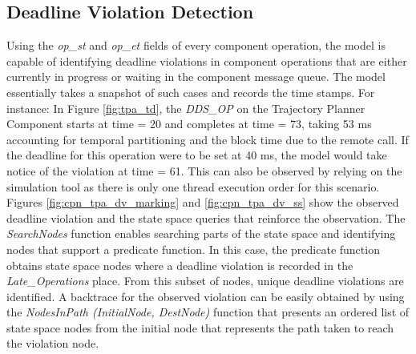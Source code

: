 
\subsection{Deadline Violation Detection}

Using the \emph{op\_st} and \emph{op\_et} fields of every component operation, the model is capable of identifying deadline violations in component operations that are either currently in progress or waiting in the component message queue. The model essentially takes a snapshot of such cases and records the time stamps. For instance: In Figure \ref{fig:tpa_td}, the \emph{DDS\_OP} on the Trajectory Planner Component starts at time = 20 and completes at time = 73, taking 53 ms accounting for temporal partitioning and the block time due to the remote call. If the deadline for this operation were to be set at 40 ms, the model would take notice of the violation at time = 61. This can also be observed by relying on the simulation tool as there is only one thread execution order for this scenario. Figures \ref{fig:cpn_tpa_dv_marking} and \ref{fig:cpn_tpa_dv_ss} show the observed deadline violation and the state space queries that reinforce the observation. The \emph{SearchNodes} function enables searching parts of the state space and identifying nodes that support a predicate function. In this case, the predicate function obtains state space nodes where a deadline violation is recorded in the \emph{Late\_Operations} place. From this subset of nodes, unique deadline violations are identified. A backtrace for the observed violation can be easily obtained by using the \emph{NodesInPath (InitialNode, DestNode)} function that presents an ordered list of state space nodes from the initial node that represents the path taken to reach the violation node.

